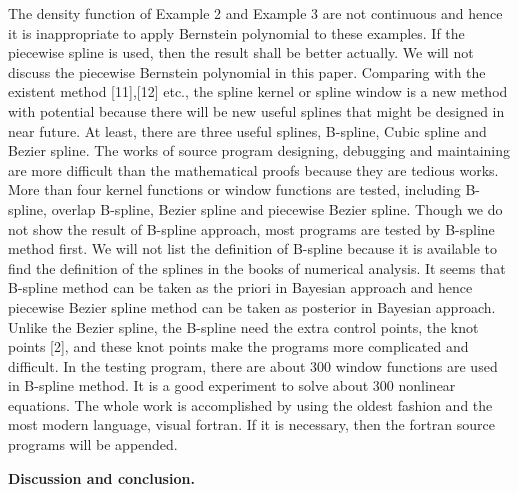 \documentclass [18pt]{article}
\begin{document}
The density function of Example 2 and Example 3 are not continuous and hence
it is inappropriate to apply Bernstein polynomial to these examples. If the
piecewise spline is used, then the result shall be better actually. We will
not discuss the piecewise Bernstein polynomial in this paper. Comparing with
the existent method [11],[12] etc., the spline kernel or spline window is a
new method with potential because there will be new useful splines that
might be designed in near future. At least, there are three useful splines,
B-spline, Cubic spline and Bezier spline. The works of source program
designing, debugging and maintaining are more difficult than the
mathematical proofs because they are tedious works. More than four kernel
functions or window functions are tested, including B-spline, overlap
B-spline, Bezier spline and piecewise Bezier spline. Though we do not show
the result of B-spline approach, most programs are tested by B-spline method
first. We will not list the definition of B-spline because it is available
to find the definition of the splines in the books of numerical analysis. It
seems that B-spline method can be taken as the priori in Bayesian approach
and hence piecewise Bezier spline method can be taken as posterior in
Bayesian approach. Unlike the Bezier spline, the B-spline need the extra
control points, the knot points [2], and these knot points make the programs
more complicated and difficult. In the testing program, there are about 300
window functions are used in B-spline method. It is a good experiment to
solve about 300 nonlinear equations. The whole work is accomplished by using
the oldest fashion and the most modern language, visual fortran. If it is
necessary, then the fortran source programs will be appended.



\textbf{Discussion and conclusion. }
\end{document}
